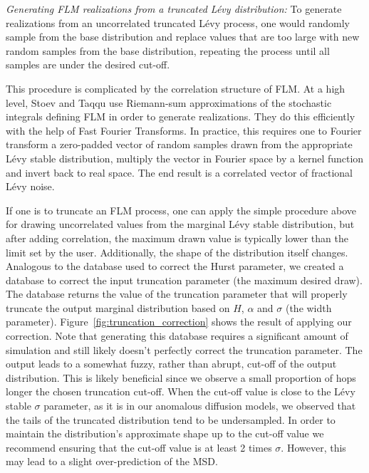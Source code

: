 \documentclass{article}
\begin{document}
  \textit{Generating FLM realizations from a truncated L\'evy distribution:}
  To generate realizations from an uncorrelated truncated L\'evy process, one would
  randomly sample from the base distribution and replace values that are too large
  with new random samples from the base distribution, repeating the process until
  all samples are under the desired cut-off. 
  
  This procedure is complicated by the correlation structure of FLM. At a high level,
  Stoev and Taqqu use Riemann-sum approximations of the stochastic integrals defining
  FLM in order to generate realizations. They do this efficiently with the help of 
  Fast Fourier Transforms. In practice, this requires one to Fourier transform a zero-padded
  vector of random samples drawn from the appropriate L\'evy stable distribution, multiply
  the vector in Fourier space by a kernel function and invert back to real space. The end
  result is a correlated vector of fractional L\'evy noise.
  
  If one is to truncate an FLM process, one can apply the simple procedure above for 
  drawing uncorrelated values from the marginal L\'evy stable distribution, but after
  adding correlation, the maximum drawn value is typically lower than the limit set 
  by the user. Additionally, the shape of the distribution itself changes. Analogous
  to the database used to correct the Hurst parameter, we created a database to 
  correct the input truncation parameter (the maximum desired draw). The database
  returns the value of the truncation parameter that will properly truncate the
  output marginal distribution based on $H$, $\alpha$ and $\sigma$ (the width parameter).
  Figure~\ref{fig:truncation_correction} shows the result of applying our correction.
  Note that generating this database requires a significant amount of simulation and
  still likely doesn't perfectly correct the truncation parameter. The output leads
  to a somewhat fuzzy, rather than abrupt, cut-off of the output distribution. This 
  is likely beneficial since we observe a small proportion of hops longer the chosen
  truncation cut-off. When the cut-off value is close to the L\'evy stable $\sigma$ parameter,
  as it is in our anomalous diffusion models, we observed that the tails of the 
  truncated distribution tend to be undersampled. In order to maintain the distribution's 
  approximate shape up to the cut-off value we recommend ensuring that the cut-off
  value is at least 2 times $\sigma$. However, this may lead to a slight over-prediction
  of the MSD.
  
\end{document}

